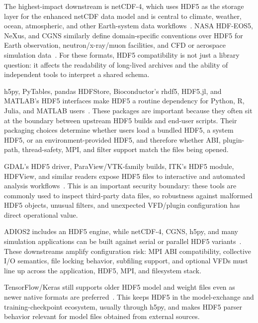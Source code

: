 \documentclass[../main.tex]{subfiles}
\begin{document}
\begin{description}[leftmargin=1.5em,style=nextline]
    \item[Scientific data models and exchange formats.]
    The highest-impact downstream is netCDF-4, which uses HDF5 as the storage
    layer for the enhanced netCDF data model and is central to climate, weather,
    ocean, atmospheric, and other Earth-system data workflows~\cite{netcdf4-format}.
    NASA HDF-EOS5, NeXus, and CGNS similarly define domain-specific conventions
    over HDF5 for Earth observation, neutron/x-ray/muon facilities, and CFD or
    aerospace simulation data~\cite{hdf-eos5,nexus-format,cgns-hdf5}. For these
    formats, HDF5 compatibility is not just a library question: it affects the
    readability of long-lived archives and the ability of independent tools to
    interpret a shared schema.

    \item[Language bindings and analysis libraries.]
    h5py, PyTables, pandas HDFStore, Bioconductor's rhdf5, HDF5.jl, and MATLAB's
    HDF5 interfaces make HDF5 a routine dependency for Python, R, Julia, and
    MATLAB users~\cite{h5py-docs,pytables-docs,pandas-hdfstore,rhdf5,hdf5-jl,matlab-hdf5}.
    These packages are important because they often sit at the boundary between
    upstream HDF5 builds and end-user scripts. Their packaging choices determine
    whether users load a bundled HDF5, a system HDF5, or an environment-provided
    HDF5, and therefore whether ABI, plugin-path, thread-safety, MPI, and filter
    support match the files being opened.

    \item[Geospatial, visualization, and inspection tools.]
    GDAL's HDF5 driver, ParaView/VTK-family builds, ITK's HDF5 module, HDFView,
    and similar readers expose HDF5 files to interactive and automated analysis
    workflows~\cite{gdal-hdf5,paraview-build,itk-hdf5}. This is an important
    security boundary: these tools are commonly used to inspect third-party data
    files, so robustness against malformed HDF5 objects, unusual filters, and
    unexpected VFD/plugin configuration has direct operational value.

    \item[HPC and parallel-I/O frameworks.]
    ADIOS2 includes an HDF5 engine, while netCDF-4, CGNS, h5py, and many
    simulation applications can be built against serial or parallel HDF5
    variants~\cite{adios2-hdf5}. These downstreams amplify configuration risk:
    MPI ABI compatibility, collective I/O semantics, file locking behavior,
    subfiling support, and optional VFDs must line up across the application,
    HDF5, MPI, and filesystem stack.

    \item[Machine-learning and model-artifact workflows.]
    TensorFlow/Keras still supports older HDF5 model and weight files even as
    newer native formats are preferred~\cite{tensorflow-keras-hdf5}. This keeps
    HDF5 in the model-exchange and training-checkpoint ecosystem, usually through
    h5py, and makes HDF5 parser behavior relevant for model files obtained from
    external sources.
\end{description}
\end{document}
